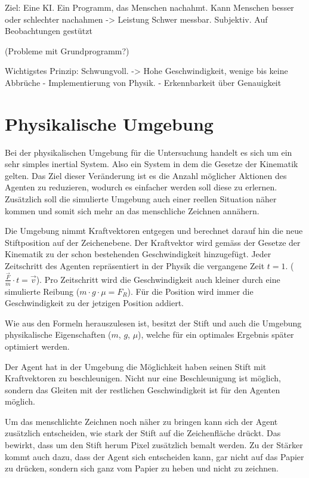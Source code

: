 Ziel: Eine KI. Ein Programm, das Menschen nachahmt. 
Kann Menschen besser oder schlechter nachahmen -> Leistung
Schwer messbar. Subjektiv. Auf Beobachtungen gestützt

    (Probleme mit Grundprogramm?)
    
    Wichtigstes Prinzip: Schwungvoll. -> Hohe Geschwindigkeit, wenige bis keine Abbrüche
        - Implementierung von Physik. 
        - Erkennbarkeit über Genauigkeit


\section{Physikalische Umgebung}
Bei der physikalischen Umgebung für die Untersuchung handelt es sich um ein sehr
simples inertial System. Also ein System in dem die Gesetze der Kinematik
gelten. Das Ziel dieser Veränderung ist es die Anzahl möglicher Aktionen des
Agenten zu reduzieren, wodurch es einfacher werden soll diese zu erlernen.
Zusätzlich soll die simulierte Umgebung auch einer reellen Situation näher
kommen und somit sich mehr an das menschliche Zeichnen annähern.

Die Umgebung nimmt Kraftvektoren entgegen und berechnet darauf hin die neue
Stiftposition auf der Zeichenebene. Der Kraftvektor wird gemäss der Gesetze der
Kinematik zu der schon bestehenden Geschwindigkeit hinzugefügt. Jeder
Zeitschritt des Agenten repräsentiert in der Physik die vergangene Zeit $t=1$.
($\frac{\vec{F}}{m}\cdot t=\vec{v}$). Pro Zeitschritt wird die Geschwindigkeit
auch kleiner durch eine simulierte Reibung ($m\cdot g \cdot \mu = F_R$). Für die
Position wird immer die Geschwindigkeit zu der jetzigen Position addiert.

Wie aus den Formeln herauszulesen ist, besitzt der Stift und auch die Umgebung
physikalische Eigenschaften ($m$, $g$, $\mu$), welche für ein optimales Ergebnis
später optimiert werden.

Der Agent hat in der Umgebung die Möglichkeit haben seinen Stift mit
Kraftvektoren zu beschleunigen. Nicht nur eine Beschleunigung ist möglich,
sondern das Gleiten mit der restlichen Geschwindigkeit ist für den Agenten
möglich.

Um das menschlichte Zeichnen noch näher zu bringen kann sich der Agent
zusätzlich entscheiden, wie stark der Stift auf die Zeichenfläche drückt. Das
bewirkt, dass um den Stift herum Pixel zusätzlich bemalt werden. Zu der Stärker
kommt auch dazu, dass der Agent sich entscheiden kann, gar nicht auf das Papier
zu drücken, sondern sich ganz vom Papier zu heben und nicht zu zeichnen.

